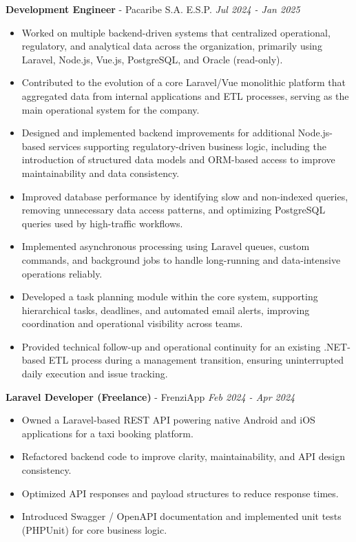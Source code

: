 \documentclass[9pt,letterpaper]{extarticle}
\begin{document}
	\textbf{Development Engineer} - {Pacaribe S.A. E.S.P.}
	\hfill \textit{Jul 2024 - Jan 2025}
	\begin{itemize}
		\item Worked on multiple backend-driven systems that centralized operational, regulatory, and analytical data across the organization, primarily using Laravel, Node.js, Vue.js, PostgreSQL, and Oracle (read-only).
		\item Contributed to the evolution of a core Laravel/Vue monolithic platform that aggregated data from internal applications and ETL processes, serving as the main operational system for the company.
		\item Designed and implemented backend improvements for additional Node.js-based services supporting regulatory-driven business logic, including the introduction of structured data models and ORM-based access to improve maintainability and data consistency.
		\item Improved database performance by identifying slow and non-indexed queries, removing unnecessary data access patterns, and optimizing PostgreSQL queries used by high-traffic workflows.
		\item Implemented asynchronous processing using Laravel queues, custom commands, and background jobs to handle long-running and data-intensive operations reliably.
		\item Developed a task planning module within the core system, supporting hierarchical tasks, deadlines, and automated email alerts, improving coordination and operational visibility across teams.
		\item Provided technical follow-up and operational continuity for an existing .NET-based ETL process during a management transition, ensuring uninterrupted daily execution and issue tracking.
	\end{itemize}
	
	\textbf{Laravel Developer (Freelance)} - {FrenziApp}
	\hfill \textit{Feb 2024 - Apr 2024}
	\begin{itemize}
		\item Owned a Laravel‑based REST API powering native Android and iOS applications for a taxi booking platform.
		\item Refactored backend code to improve clarity, maintainability, and API design consistency.
		\item Optimized API responses and payload structures to reduce response times.
		\item Introduced Swagger / OpenAPI documentation and implemented unit tests (PHPUnit) for core business logic.
	\end{itemize}
	
\end{document}
